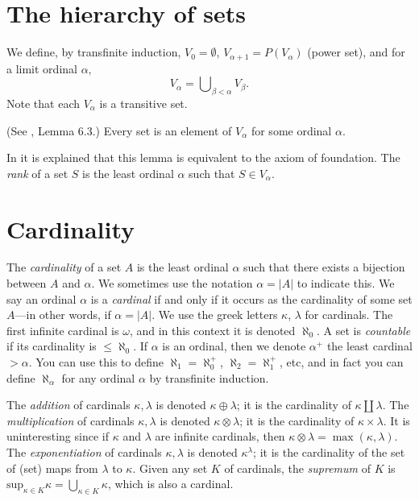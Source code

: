 \section{The hierarchy of sets}
\label{section-sets-hierarchy}

\noindent
We define, by transfinite induction, $V_0 = \emptyset$,
$V_{\alpha + 1} = P(V_\alpha)$ (power set),
and for a limit ordinal $\alpha$,
$$
V_\alpha = \bigcup\nolimits_{\beta < \alpha} V_\beta.
$$
Note that each $V_\alpha$ is a transitive set.

\begin{lemma}
\label{lemma-axiom-regularity}
(See \cite{Jech}, Lemma 6.3.)
Every set is an element of $V_\alpha$ for some ordinal $\alpha$.
\end{lemma}

\noindent
In \cite[Chapter III]{Kunen} it is explained that this lemma is
equivalent to the axiom of foundation. The {\it rank} of
a set $S$ is the least ordinal $\alpha$ such that $S \in V_\alpha$.

\section{Cardinality}
\label{section-cardinals}

\noindent
The {\it cardinality} of a set $A$ is the least ordinal $\alpha$
such that there exists a bijection between $A$ and $\alpha$.
We sometimes use the notation $\alpha = |A|$ to indicate this.
We say an ordinal $\alpha$ is a {\it cardinal} if and only
if it occurs as the cardinality of some set $A$---in other words, if
$\alpha = |A|$. We use the greek letters $\kappa$, $\lambda$
for cardinals. The first infinite cardinal is $\omega$, and in this
context it is denoted $\aleph_0$. A set is {\it countable} if its cardinality
is $\leq \aleph_0$. If $\alpha$ is an ordinal, then we denote
$\alpha^+$ the least cardinal $> \alpha$. You can use this to
define $\aleph_1 = \aleph_0^+$, $\aleph_2 = \aleph_1^+$, etc, and
in fact you can define $\aleph_\alpha$ for any ordinal $\alpha$ by
transfinite induction.

\medskip\noindent
The {\it addition} of cardinals $\kappa, \lambda$
is denoted $\kappa \oplus \lambda$; it is the cardinality of
$\kappa \amalg \lambda$. The {\it multiplication} of cardinals
$\kappa, \lambda$ is denoted $\kappa \otimes \lambda$; it is the
cardinality of $\kappa \times \lambda$. It is uninteresting since if
$\kappa$ and $\lambda$ are infinite cardinals, then
$\kappa \otimes \lambda = \max(\kappa, \lambda)$.
The {\it exponentiation}
of cardinals $\kappa, \lambda$ is denoted $\kappa^\lambda$; it is
the cardinality of the set of (set) maps from $\lambda$ to $\kappa$.
Given any set $K$ of cardinals, the {\it supremum} of $K$
is $\text{sup}_{\kappa \in K} \kappa = \bigcup_{\kappa \in K} \kappa$, 
which is also a cardinal.

